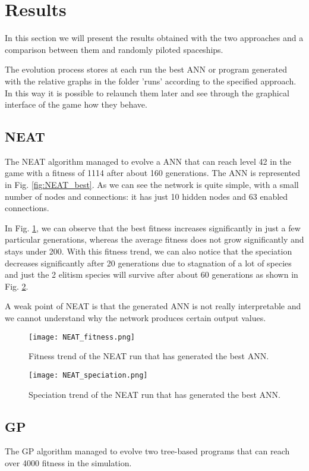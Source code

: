 \section{Results}
In this section we will present the results obtained with the two approaches and a
comparison between them and randomly piloted spaceships.

The evolution process stores at each run the best ANN or program generated with the
relative graphs in the folder 'runs' according to the specified approach. In this way it is
possible to relaunch them later and see through the graphical interface of the game how
they behave.


\subsection{NEAT}
The NEAT algorithm managed to evolve a ANN that can reach level 42 in the game with a
fitness of 1114 after about 160 generations. The ANN is represented in Fig. \ref{fig:NEAT_best}. As we can
see the network is quite simple, with a small number of nodes and connections: it has just 10
hidden nodes and 63 enabled connections.


In Fig. \ref{fig:NEAT_fitness}, we can observe that the best fitness increases significantly in just a few particular
generations, whereas the average fitness does not grow significantly and stays under 200.
With this fitness trend, we can also notice that the speciation decreases significantly after 20
generations due to stagnation of a lot of species and just the 2 elitism species will survive
after about 60 generations as shown in Fig. \ref{fig:NEAT_speciation}.

A weak point of NEAT is that the generated ANN is not really interpretable and we cannot
understand why the network produces certain output values.

\begin{figure}[ht]
\centerline{\texttt{[image: NEAT\_fitness.png]}}
\caption{Fitness trend of the NEAT run that has generated the best ANN.}
\label{fig:NEAT_fitness}
\end{figure}


\begin{figure}[ht]
\centerline{\texttt{[image: NEAT\_speciation.png]}}
\caption{Speciation trend of the NEAT run that has generated the best ANN.}
\label{fig:NEAT_speciation}
\end{figure}


\subsection{GP}
The GP algorithm managed to evolve two tree-based programs that can reach over 4000 fitness in the simulation.

